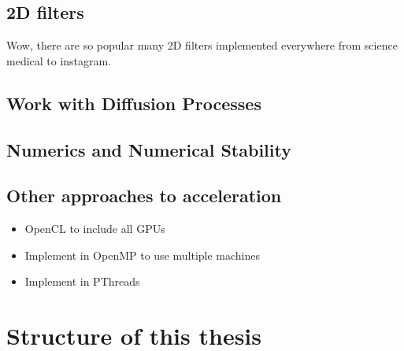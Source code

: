 %
%
%
%
\subsection{2D filters}
Wow, there are so popular many 2D filters implemented everywhere from science medical to instagram.

%
%
%
%
\subsection{Work with Diffusion Processes}

%
%
%
%
\subsection{Numerics and Numerical Stability}

%
%
%
%
\subsection{Other approaches to acceleration}
\begin{itemize}
	\item OpenCL to include all GPUs
	\item Implement in OpenMP to use multiple machines
	\item Implement in PThreads
\end{itemize}



%
\section{Structure of this thesis}
